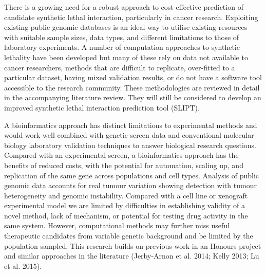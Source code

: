 There is a growing need for a robust approach to cost-effective prediction of candidate synthetic lethal interaction, particularly in cancer research.  Exploiting existing public genomic databases is an ideal way to utilise existing resources with suitable sample sizes, data types, and different limitations to those of laboratory experiments.  A number of computation approaches to synthetic lethality have been developed but many of these rely on data not available to cancer researchers, methods that are difficult to replicate, over-fitted to a particular dataset, having mixed validation results, or do not have a software tool accessible to the research community.  These methodologies are reviewed in detail in the accompanying literature review.  They will still be considered to develop an improved synthetic lethal interaction prediction tool (SLIPT).  

A bioinformatics approach has distinct limitations to experimental methods and would work well combined with genetic screen data and conventional molecular biology laboratory validation techniques to answer biological research questions.  Compared with an experimental screen, a bioinformatics approach has the benefits of reduced costs, with the potential for automation, scaling up, and replication of the same gene across populations and cell types.  Analysis of public genomic data accounts for real tumour variation showing detection with tumour heterogeneity and genomic instability.  Compared with a cell line or xenograft experimental model we are limited by difficulties in establishing validity of a novel method, lack of mechanism, or potential for testing drug activity in the same system.  However, computational methods may further miss useful therapeutic candidates from variable genetic background and be limited by the population sampled.  This research builds on previous work in an Honours project and similar approaches in the literature (Jerby-Arnon et al. 2014; Kelly 2013; Lu et al. 2015).
\fi